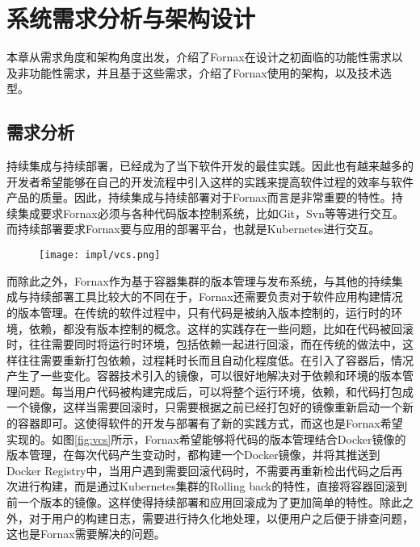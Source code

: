 
\chapter{系统需求分析与架构设计}
\label{chap:impl}

本章从需求角度和架构角度出发，介绍了Fornax在设计之初面临的功能性需求以及非功能性需求，并且基于这些需求，介绍了Fornax使用的架构，以及技术选型。

\section{需求分析}

持续集成与持续部署，已经成为了当下软件开发的最佳实践。因此也有越来越多的开发者希望能够在自己的开发流程中引入这样的实践来提高软件过程的效率与软件产品的质量。因此，持续集成与持续部署对于Fornax而言是非常重要的特性。持续集成要求Fornax必须与各种代码版本控制系统，比如Git，Svn等等进行交互。而持续部署要求Fornax要与应用的部署平台，也就是Kubernetes进行交互。

\begin{figure}[!htp]
  \centering
  \texttt{[image: impl/vcs.png]}
\end{figure}

而除此之外，Fornax作为基于容器集群的版本管理与发布系统，与其他的持续集成与持续部署工具比较大的不同在于，Fornax还需要负责对于软件应用构建情况的版本管理。在传统的软件过程中，只有代码是被纳入版本控制的，运行时的环境，依赖，都没有版本控制的概念。这样的实践存在一些问题，比如在代码被回滚时，往往需要同时将运行时环境，包括依赖一起进行回滚，而在传统的做法中，这样往往需要重新打包依赖，过程耗时长而且自动化程度低。在引入了容器后，情况产生了一些变化。容器技术引入的镜像，可以很好地解决对于依赖和环境的版本管理问题。每当用户代码被构建完成后，可以将整个运行环境，依赖，和代码打包成一个镜像，这样当需要回滚时，只需要根据之前已经打包好的镜像重新启动一个新的容器即可。这使得软件的开发与部署有了新的实践方式，而这也是Fornax希望实现的。如图\ref{fig:vcs}所示，Fornax希望能够将代码的版本管理结合Docker镜像的版本管理，在每次代码产生变动时，都构建一个Docker镜像，并将其推送到Docker Registry中，当用户遇到需要回滚代码时，不需要再重新检出代码之后再次进行构建，而是通过Kubernetes集群的Rolling back的特性，直接将容器回滚到前一个版本的镜像。这样使得持续部署和应用回滚成为了更加简单的特性。除此之外，对于用户的构建日志，需要进行持久化地处理，以便用户之后便于排查问题，这也是Fornax需要解决的问题。

